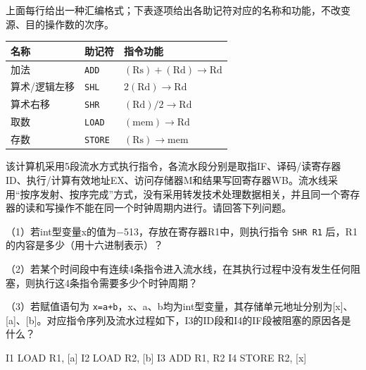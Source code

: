 上面每行给出一种汇编格式；下表逐项给出各助记符对应的名称和功能，不改变源、目的操作数的次序。

\par\medskip\noindent\begin{minipage}{\linewidth}\fontsize{9.3}{12}\selectfont\begin{tabularx}{\linewidth}{@{}YYY@{}}
\toprule\noalign{}
名称 & 助记符 & 指令功能 \\
\midrule\noalign{}


加法 & \texttt{ADD} & \((\mathrm{Rs})+(\mathrm{Rd})\to\mathrm{Rd}\) \\
算术/逻辑左移 & \texttt{SHL} & \(2(\mathrm{Rd})\to\mathrm{Rd}\) \\
算术右移 & \texttt{SHR} & \((\mathrm{Rd})/2\to\mathrm{Rd}\) \\
取数 & \texttt{LOAD} & \((\mathrm{mem})\to\mathrm{Rd}\) \\
存数 & \texttt{STORE} & \((\mathrm{Rs})\to\mathrm{mem}\) \\
\bottomrule\end{tabularx}
\end{minipage}\par\medskip

该计算机采用5段流水方式执行指令，各流水段分别是取指IF、译码/读寄存器ID、执行/计算有效地址EX、访问存储器M和结果写回寄存器WB。流水线采用``按序发射、按序完成''方式，没有采用转发技术处理数据相关，并且同一个寄存器的读和写操作不能在同一个时钟周期内进行。请回答下列问题。

（1）若int型变量x的值为\ensuremath{-}513，存放在寄存器R1中，则执行指令 \texttt{SHR R1} 后，R1的内容是多少（用十六进制表示）？

（2）若某个时间段中有连续4条指令进入流水线，在其执行过程中没有发生任何阻塞，则执行这4条指令需要多少个时钟周期？

（3）若赋值语句为 \texttt{x=\allowbreak{}a+\allowbreak{}b}，x、a、b均为int型变量，其存储单元地址分别为{[}x{]}、{[}a{]}、{[}b{]}。对应指令序列及流水过程如下，I3的ID段和I4的IF段被阻塞的原因各是什么？

\par\medskip\noindent\begin{minipage}{\linewidth}
\begin{codeblock}[language={}]
I1  LOAD  R1, [a]
I2  LOAD  R2, [b]
I3  ADD   R1, R2
I4  STORE R2, [x]
\end{codeblock}
\end{minipage}\par\medskip

